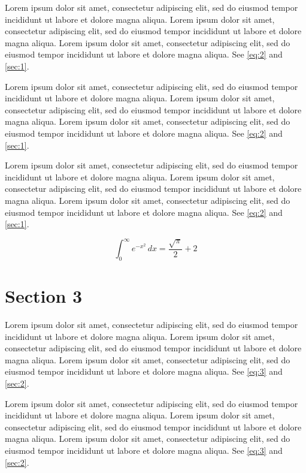 \documentclass[11pt]{article}
\begin{document}
Lorem ipsum dolor sit amet, consectetur adipiscing elit, sed do eiusmod tempor incididunt ut labore et dolore magna aliqua. Lorem ipsum dolor sit amet, consectetur adipiscing elit, sed do eiusmod tempor incididunt ut labore et dolore magna aliqua. Lorem ipsum dolor sit amet, consectetur adipiscing elit, sed do eiusmod tempor incididunt ut labore et dolore magna aliqua. See \cref{eq:2} and \cref{sec:1}.

Lorem ipsum dolor sit amet, consectetur adipiscing elit, sed do eiusmod tempor incididunt ut labore et dolore magna aliqua. Lorem ipsum dolor sit amet, consectetur adipiscing elit, sed do eiusmod tempor incididunt ut labore et dolore magna aliqua. Lorem ipsum dolor sit amet, consectetur adipiscing elit, sed do eiusmod tempor incididunt ut labore et dolore magna aliqua. See \cref{eq:2} and \cref{sec:1}.

Lorem ipsum dolor sit amet, consectetur adipiscing elit, sed do eiusmod tempor incididunt ut labore et dolore magna aliqua. Lorem ipsum dolor sit amet, consectetur adipiscing elit, sed do eiusmod tempor incididunt ut labore et dolore magna aliqua. Lorem ipsum dolor sit amet, consectetur adipiscing elit, sed do eiusmod tempor incididunt ut labore et dolore magna aliqua. See \cref{eq:2} and \cref{sec:1}.

\begin{equation}\label{eq:2} \int_0^\infty e^{-x^2}\,dx = \frac{\sqrt{\pi}}{2} + 2\end{equation}
\section{Section 3}\label{sec:3}
Lorem ipsum dolor sit amet, consectetur adipiscing elit, sed do eiusmod tempor incididunt ut labore et dolore magna aliqua. Lorem ipsum dolor sit amet, consectetur adipiscing elit, sed do eiusmod tempor incididunt ut labore et dolore magna aliqua. Lorem ipsum dolor sit amet, consectetur adipiscing elit, sed do eiusmod tempor incididunt ut labore et dolore magna aliqua. See \cref{eq:3} and \cref{sec:2}.

Lorem ipsum dolor sit amet, consectetur adipiscing elit, sed do eiusmod tempor incididunt ut labore et dolore magna aliqua. Lorem ipsum dolor sit amet, consectetur adipiscing elit, sed do eiusmod tempor incididunt ut labore et dolore magna aliqua. Lorem ipsum dolor sit amet, consectetur adipiscing elit, sed do eiusmod tempor incididunt ut labore et dolore magna aliqua. See \cref{eq:3} and \cref{sec:2}.
\end{document}
